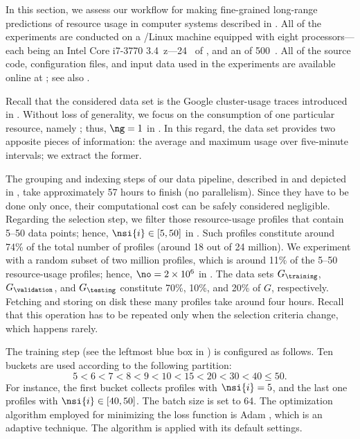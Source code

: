 In this section, we assess our workflow for making fine-grained long-range
predictions of resource usage in computer systems described in
. All of the experiments are conducted on a /Linux
machine equipped with eight processors---each being an Intel Core i7-3770
3.4~z---24~ of , and an  of 500~. All of
the source code, configuration files, and input data used in the experiments are
available online at \cite{eslab2017b}; see also \cite{eslab2017c}.


Recall that the considered data set is the Google cluster-usage traces
\cite{reiss2011} introduced in . Without loss of
generality, we focus on the consumption of one particular resource, namely
; thus, $\ng = 1$ in . In this regard, the data set
provides two apposite pieces of information: the average and maximum 
usage over five-minute intervals; we extract the former.

The grouping and indexing steps of our data pipeline, described in
 and depicted in , take
approximately 57 hours to finish (no parallelism). Since they have to be done
only once, their computational cost can be safely considered negligible.
Regarding the selection step, we filter those resource-usage profiles that
contain 5--50 data points; hence, $\nsi{i} \in [5, 50]$ in .
Such profiles constitute around 74\% of the total number of profiles (around 18
out of 24 million). We experiment with a random subset of two million profiles,
which is around 11\% of the 5--50 resource-usage profiles; hence, $\no = 2
\times 10^6$ in . The data sets $G_\training$,
$G_\validation$, and $G_\testing$ constitute 70\%, 10\%, and 20\% of $G$,
respectively. Fetching and storing on disk these many profiles take around four
hours. Recall that this operation has to be repeated only when the selection
criteria change, which happens rarely.


The training step (see the leftmost blue box in ) is
configured as follows. Ten buckets are used according to the following
partition:
\[
  5 < 6 < 7 < 8 < 9 < 10 < 15 < 20 < 30 < 40 \leq 50.
\]
For instance, the first bucket collects profiles with $\nsi{i} = 5$, and the
last one profiles with $\nsi{i} \in [40, 50]$. The batch size \nb is set to 64.
The optimization algorithm employed for minimizing the loss function is Adam
\cite{kingma2014}, which is an adaptive technique. The algorithm is applied with
its default settings.

